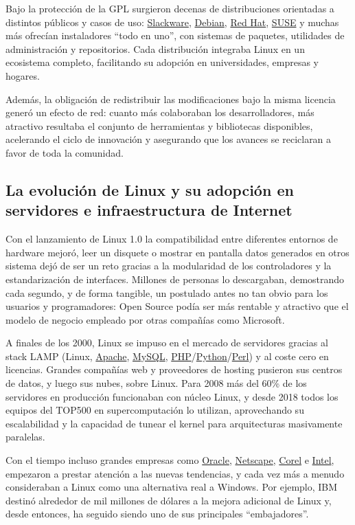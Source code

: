 \documentclass[a4paper,12pt]{article}
\begin{document}
Bajo la protección de la GPL surgieron decenas de distribuciones orientadas a
distintos públicos y casos de uso: \hyperlink{slackware}{Slackware}, \hyperlink{debian}{Debian}, 
\hyperlink{redhatcanonical}{Red Hat}, \hyperlink{suse}{SUSE} y muchas más
ofrecían instaladores ``todo en uno”, con sistemas de paquetes, utilidades de
administración y repositorios. Cada distribución integraba Linux en un
ecosistema completo, facilitando su adopción en universidades, empresas y
hogares.

Además, la obligación de redistribuir las modificaciones bajo la misma licencia 
generó un efecto de red: cuanto más colaboraban los desarrolladores, más
atractivo resultaba el conjunto de herramientas y bibliotecas disponibles,
acelerando el ciclo de innovación y asegurando que los avances se reciclaran a
favor de toda la comunidad.


\subsection{La evolución de Linux y su adopción en servidores e infraestructura de Internet}

Con el lanzamiento de Linux 1.0 la compatibilidad entre diferentes entornos de
hardware mejoró, leer un disquete o mostrar en pantalla datos generados en otros
sistema dejó de ser un reto gracias a la modularidad de los controladores y la
estandarización de interfaces. Millones de personas lo descargaban, demostrando
cada segundo, y de forma tangible, un postulado antes no tan obvio para los 
usuarios y programadores: Open Source podía ser más rentable y atractivo que el
modelo de negocio empleado por otras compañías como Microsoft.

A finales de los 2000, Linux se impuso en el mercado de servidores gracias al
stack LAMP (Linux, \hyperlink{apache}{Apache}, \hyperlink{mysql}{MySQL},
\hyperlink{php}{PHP}/\hyperlink{python}{Python}/\hyperlink{perl}{Perl}) y al
coste cero en licencias.  Grandes compañías web y proveedores de hosting
pusieron sus centros de datos, y luego sus nubes, sobre Linux. Para 2008 más del
60\% de los servidores en producción funcionaban con núcleo Linux, y desde 2018
todos los equipos del TOP500 en supercomputación lo utilizan, aprovechando su
escalabilidad y la 
capacidad de tunear el kernel para arquitecturas masivamente paralelas.

Con el tiempo incluso grandes empresas como \hyperlink{oracle}{Oracle},
\hyperlink{netscape}{Netscape}, \hyperlink{corel}{Corel} e
\hyperlink{intel}{Intel}, empezaron a prestar atención a las nuevas tendencias,
y cada vez más a menudo consideraban a Linux como una alternativa real a
Windows. Por ejemplo, IBM destinó alrededor de mil millones de dólares a la
mejora adicional de Linux y, desde entonces, ha seguido siendo uno de sus
principales “embajadores”.
\end{document}
